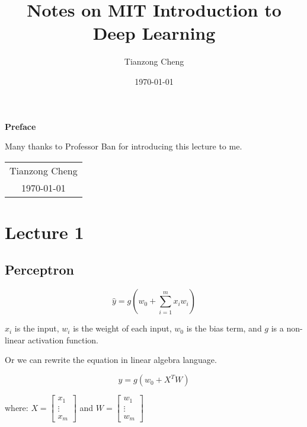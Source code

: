 \documentclass[12pt, a4paper, oneside]{article}
\title{{\Huge{\textbf{Notes on MIT Introduction to Deep Learning}}}}
\author{Tianzong Cheng}
\date{\today}
\begin{document}
\maketitle
\thispagestyle{empty}

\newpage
\thispagestyle{empty}
\begin{center}
    \Huge\textbf{Preface}
\end{center}
Many thanks to Professor Ban for introducing this lecture to me.
\begin{flushright}
    \begin{tabular}{c}
        Tianzong Cheng \\
        \today
    \end{tabular}
\end{flushright}

\newpage
{}
\setcounter{page}{1}
\tableofcontents

\newpage
\setcounter{page}{1}

\section{Lecture 1}

\subsection{Perceptron}

\begin{equation*}
    \hat{y}=g(w_{0}+\sum_{i=1}^{m}x_{i}w_{i})
\end{equation*}

$x_{i}$ is the input, $w_{i}$ is the weight of each input, $w_{0}$ is the bias term, and $g$ is a non-linear activation function.

Or we can rewrite the equation in linear algebra language.

\begin{equation*}
    \hat{y} = g(w_{0}+X^{T}W)
\end{equation*}

where: $X=\begin{bmatrix}
        x_{1}  \\
        \vdots \\
        x_{m}
    \end{bmatrix}$ and $W=\begin{bmatrix}
        w_{1}  \\
        \vdots \\
        w_{m}
    \end{bmatrix}$
\end{document}
